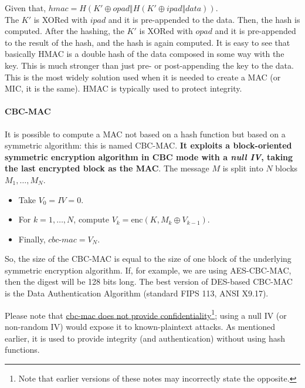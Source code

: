 Given that, \(hmac = H(K' \oplus opad \Vert H(K' \oplus ipad \Vert data))\).\\
The \(K'\) is XORed with \(ipad\) and it is pre-appended to the data. Then, the hash is computed. After the hashing, the \(K'\) is XORed with \(opad\) and it is pre-appended to the result of the hash, and the hash is again computed. It is easy to see that basically HMAC is a double hash of the data composed in some way with the key. This is much stronger than just pre- or post-appending the key to the data. This is the most widely solution used when it is needed to create a MAC (or MIC, it is the same). HMAC is typically used to protect integrity.


\paragraph{CBC-MAC}
It is possible to compute a MAC not based on a hash function but based on a symmetric algorithm: this is named CBC-MAC.
\textbf{It exploits a block-oriented symmetric encryption algorithm in CBC mode with a \emph{null IV}, taking the last encrypted block as the MAC}.
The message \(M\) is split into \(N\) blocks \(M_1, \ldots, M_N\). \begin{itemize}
	\item Take \(V_0  = \mathit{IV} = 0\).
	\item For \(k = 1, \ldots, N\), compute \(V_k = \text{enc}(K, M_k \oplus V_{k-1})\).
	\item Finally, \( \textit{cbc-mac} = V_N\).
\end{itemize}
So, the size of the CBC-MAC is equal to the size of one block of the underlying symmetric encryption algorithm. If, for example, we are using AES-CBC-MAC, then the digest will be 128 bits long. The best version of DES-based CBC-MAC is the Data Authentication Algorithm (standard FIPS 113, ANSI X9.17).

Please note that  \ul{cbc-mac does not provide confidentiality}\footnote{Note that earlier versions of these notes may incorrectly state the opposite.}; using a null IV (or non-random IV) would expose it to known-plaintext attacks. As mentioned earlier, it is used to provide integrity (and authentication) without using hash functions.

